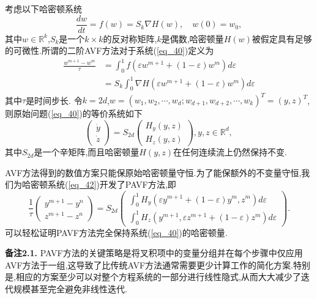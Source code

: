 考虑以下哈密顿系统
\begin{equation}
\frac{d w}{d t}=f(w)=S_{k} \nabla H(w), \quad w(0)=w_{0},
\label{eq_40}\end{equation}
其中$w \in \mathbb{R}^{k}$,$S_{k}$是一个$k \times k$的反对称矩阵,$k$是偶数,哈密顿量$H(w)$被假定具有足够的可微性.所谓的二阶AVF方法对于系统(\ref{eq_40})定义为
\begin{equation}
\begin{aligned}
\frac{w^{m+1}-w^{m}}{\tau} &=\int_{0}^{1} f\left(\varepsilon w^{m+1}+(1-\varepsilon) w^{m}\right) d \varepsilon \\
&=S_{k} \int_{0}^{1} \nabla H\left(\varepsilon w^{m+1}+(1-\varepsilon) w^{m}\right) d \varepsilon
\end{aligned}
\label{eq_41}\end{equation}
其中$\tau$是时间步长.
令$k=2d$,$w=\left(w_{1}, w_{2}, \cdots, w_{d} ; w_{d+1}, w_{d+2}, \cdots, w_{k}\right)^{T}=(y, z)^{T}$,则原始问题(\ref{eq_40})的等价系统如下
\begin{equation}
\left(\begin{array}{l}
\dot{y} \\
\dot{z}
\end{array}\right)=S_{2 d}\left(\begin{array}{c}
H_{y}(y, z) \\
H_{z}(y, z)
\end{array}\right), y, z \in \mathbb{R}^{d},
\label{eq_42}\end{equation}
其中$S_{2 d}$是一个辛矩阵,而且哈密顿量$H(y, z)$在任何连续流上仍然保持不变.

AVF方法得到的数值方案只能保原始哈密顿量守恒.为了能保额外的不变量守恒,我们为哈密顿系统(\ref{eq_42})开发了PAVF方法,即
\begin{equation}
\frac{1}{\tau}\left(\begin{array}{c}
y^{m+1}-y^{n} \\
z^{m+1}-z^{n}
\end{array}\right)=S_{2 d}\left(\begin{array}{c}
\int_{0}^{1} H_{y}\left(\varepsilon y^{m+1}+(1-\varepsilon) y^{m}, z^{m}\right) d \varepsilon \\
\int_{0}^{1} H_{z}\left(y^{m+1}, \varepsilon z^{m+1}+(1-\varepsilon) z^{m}\right) d \varepsilon
\end{array}\right) .
\label{eq_43}\end{equation}
可以轻松证明PAVF方法完全保持系统(\ref{eq_40})的哈密顿量.

\textbf{备注2.1.} PAVF方法的关键策略是将叉积项中的变量分组并在每个步骤中仅应用AVF方法于一组,这导致了比传统AVF方法通常需要更少计算工作的简化方案.特别是,相应的方案至少可以对整个方程系统的一部分进行线性隐式,从而大大减少了迭代规模甚至完全避免非线性迭代.

